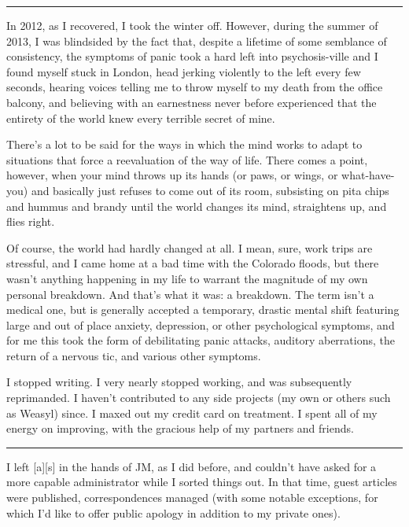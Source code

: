 \begin{center}\rule{0.5\linewidth}{\linethickness}\end{center}

In 2012, as I recovered, I took the winter off. However, during the
summer of 2013, I was blindsided by the fact that, despite a lifetime of
some semblance of consistency, the symptoms of panic took a hard left
into psychosis-ville and I found myself stuck in London, head jerking
violently to the left every few seconds, hearing voices telling me to
throw myself to my death from the office balcony, and believing with an
earnestness never before experienced that the entirety of the world knew
every terrible secret of mine.

There's a lot to be said for the ways in which the mind works to adapt
to situations that force a reevaluation of the way of life. There comes
a point, however, when your mind throws up its hands (or paws, or wings,
or what-have-you) and basically just refuses to come out of its room,
subsisting on pita chips and hummus and brandy until the world changes
its mind, straightens up, and flies right.

Of course, the world had hardly changed at all. I mean, sure, work trips
are stressful, and I came home at a bad time with the Colorado floods,
but there wasn't anything happening in my life to warrant the magnitude
of my own personal breakdown. And that's what it was: a breakdown. The
term isn't a medical one, but is generally accepted a temporary, drastic
mental shift featuring large and out of place anxiety, depression, or
other psychological symptoms, and for me this took the form of
debilitating panic attacks, auditory aberrations, the return of a
nervous tic, and various other symptoms.

I stopped writing. I very nearly stopped working, and was subsequently
reprimanded. I haven't contributed to any side projects (my own or
others such as Weasyl) since. I maxed out my credit card on treatment. I
spent all of my energy on improving, with the gracious help of my
partners and friends.

\begin{center}\rule{0.5\linewidth}{\linethickness}\end{center}

I left {[}a{]}{[}s{]} in the hands of JM, as I did before, and couldn't
have asked for a more capable administrator while I sorted things out.
In that time, guest articles were published, correspondences managed
(with some notable exceptions, for which I'd like to offer public
apology in addition to my private ones).

